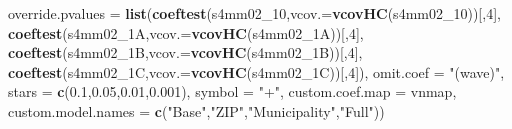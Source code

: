 \documentclass[
]{article}
\newenvironment{Shaded}{\begin{snugshade}}{\end{snugshade}}
\newcommand{\DataTypeTok}[1]{\textcolor[rgb]{0.13,0.29,0.53}{#1}}
\newcommand{\DecValTok}[1]{\textcolor[rgb]{0.00,0.00,0.81}{#1}}
\newcommand{\FloatTok}[1]{\textcolor[rgb]{0.00,0.00,0.81}{#1}}
\newcommand{\KeywordTok}[1]{\textcolor[rgb]{0.13,0.29,0.53}{\textbf{#1}}}
\newcommand{\NormalTok}[1]{#1}
\newcommand{\StringTok}[1]{\textcolor[rgb]{0.31,0.60,0.02}{#1}}
\begin{document}
\begin{Shaded}
\begin{Highlighting}[]
          \DataTypeTok{override.pvalues =} \KeywordTok{list}\NormalTok{(}\KeywordTok{coeftest}\NormalTok{(s4mm02_}\DecValTok{10}\NormalTok{,}\DataTypeTok{vcov.=}\KeywordTok{vcovHC}\NormalTok{(s4mm02_}\DecValTok{10}\NormalTok{))[,}\DecValTok{4}\NormalTok{],}
                                  \KeywordTok{coeftest}\NormalTok{(s4mm02_1A,}\DataTypeTok{vcov.=}\KeywordTok{vcovHC}\NormalTok{(s4mm02_1A))[,}\DecValTok{4}\NormalTok{],}
                                  \KeywordTok{coeftest}\NormalTok{(s4mm02_1B,}\DataTypeTok{vcov.=}\KeywordTok{vcovHC}\NormalTok{(s4mm02_1B))[,}\DecValTok{4}\NormalTok{],}
                                  \KeywordTok{coeftest}\NormalTok{(s4mm02_1C,}\DataTypeTok{vcov.=}\KeywordTok{vcovHC}\NormalTok{(s4mm02_1C))[,}\DecValTok{4}\NormalTok{]),}
          \DataTypeTok{omit.coef =} \StringTok{"(wave)"}\NormalTok{, }\DataTypeTok{stars =} \KeywordTok{c}\NormalTok{(}\FloatTok{0.1}\NormalTok{,}\FloatTok{0.05}\NormalTok{,}\FloatTok{0.01}\NormalTok{,}\FloatTok{0.001}\NormalTok{), }\DataTypeTok{symbol =} \StringTok{"+"}\NormalTok{,}
          \DataTypeTok{custom.coef.map =}\NormalTok{ vnmap, }
          \DataTypeTok{custom.model.names =} \KeywordTok{c}\NormalTok{(}\StringTok{"Base"}\NormalTok{,}\StringTok{"ZIP"}\NormalTok{,}\StringTok{"Municipality"}\NormalTok{,}\StringTok{"Full"}\NormalTok{))}
\end{Highlighting}
\end{Shaded}
\end{document}
